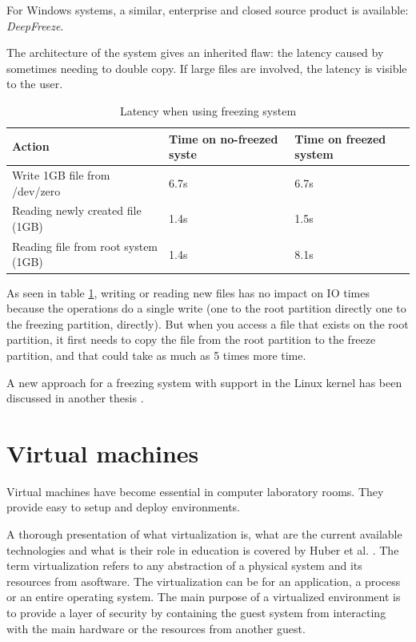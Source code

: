 For Windows systems, a similar, enterprise and closed source product is
available: \emph{DeepFreeze}.

The architecture of the system gives an inherited flaw: the latency
caused by sometimes needing to double copy. If large files are involved,
the latency is visible to the user.


\begin{table}
\begin{tabular}{|p{4cm}|p{3cm}|p{3cm}|}
\hline
Action & Time on no-freezed syste & Time on freezed system \\
\hline
Write 1GB file from /dev/zero & 6.7s & 6.7s \\
\hline
Reading newly created file (1GB) & 1.4s & 1.5s \\
\hline
Reading file from root system (1GB) & 1.4s & 8.1s \\
\hline
\end{tabular}
\caption{Latency when using freezing system}
\label{table:aufs_latency}
\end{table}

As seen in table \ref{table:aufs_latency}, writing or reading new files
has no impact on IO times because the operations do a single write (one
to the root partition directly one to the freezing partition, directly).
But when you access a file that exists on the root partition, it first
needs to copy the file from the root partition to the freeze partition,
and that could take as much as 5 times more time.

A new approach for a freezing system with support in the Linux kernel
has been discussed in another thesis \cite{paper:freezing}.

\section{Virtual machines}


Virtual machines have become essential in computer laboratory rooms.
They provide easy to setup and deploy environments.

A thorough presentation of what virtualization is, what are the current
available technologies and what is their role in education is covered by
Huber et al. \cite{paper:virtualization}. The term virtualization refers
to any abstraction of a physical system and its resources from
asoftware. The virtualization can be for an application, a process or an
entire operating system. The main purpose of a virtualized environment
is to provide a layer of security by containing the guest system from
interacting with the main hardware or the resources from another guest.

